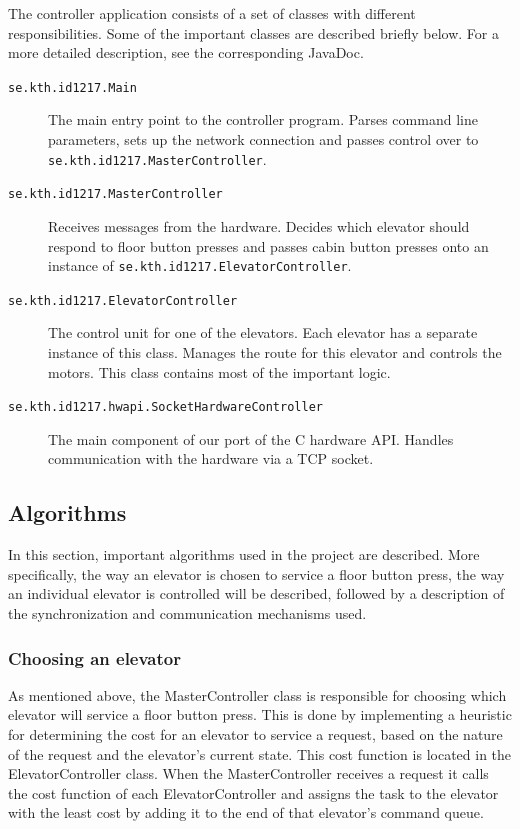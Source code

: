 \documentclass[a4paper]{article}
\begin{document}
The controller application consists of a set of classes with different
responsibilities. Some of the important classes are described briefly below. For
a more detailed description, see the corresponding JavaDoc.

\begin{description}

\item[\texttt{se.kth.id1217.Main}] The main entry point to the controller
    program. Parses command line parameters, sets up the network connection and
    passes control over to \texttt{se.kth.id1217.MasterController}.

\item[\texttt{se.kth.id1217.MasterController}] Receives messages from the
    hardware. Decides which elevator should respond to floor button presses and
    passes cabin button presses onto an instance of
    \texttt{se.kth.id1217.ElevatorController}.

\item[\texttt{se.kth.id1217.ElevatorController}] The control unit for one of the
    elevators. Each elevator has a separate instance of this class. Manages the
    route for this elevator and controls the motors. This class contains most of
    the important logic.

\item[\texttt{se.kth.id1217.hwapi.SocketHardwareController}] The main component
    of our port of the C hardware API. Handles communication with the hardware
    via a TCP socket.

\end{description}

\subsection{Algorithms}
In this section, important algorithms used in the project are described. More specifically, the way an elevator is chosen to service a floor button press, the way an individual elevator is controlled will be described, followed by a description of the synchronization and communication mechanisms used.

\subsubsection{Choosing an elevator}
As mentioned above, the MasterController class is responsible for choosing which elevator will service a floor button press. This is done by implementing a heuristic for determining the cost for an elevator to service a request, based on the nature of the request and the elevator's current state. This cost function is located in the ElevatorController class. When the MasterController receives a request it calls the cost function of each ElevatorController and assigns the task to the elevator with the least cost by adding it to the end of that elevator's command queue.
\end{document}
